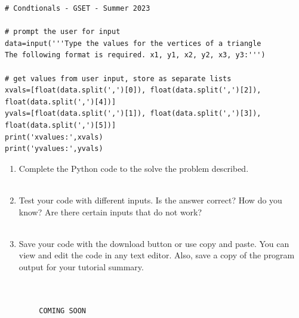 \documentclass[12pt]{article}
\begin{document}
\begin{description}[labelindent=1cm]
        \begin{lstlisting}
# Condtionals - GSET - Summer 2023 

# prompt the user for input
data=input('''Type the values for the vertices of a triangle
The following format is required. x1, y1, x2, y2, x3, y3:''')

# get values from user input, store as separate lists 
xvals=[float(data.split(',')[0]), float(data.split(',')[2]), float(data.split(',')[4])]
yvals=[float(data.split(',')[1]), float(data.split(',')[3]), float(data.split(',')[5])]
print('xvalues:',xvals)
print('yvalues:',yvals)

        \end{lstlisting}

\newpage
        \item[\textbf{\underline{Testing:}}] \hfill \vspace{0mm}
        \begin{enumerate}

        \item Complete the Python code to the solve the problem described. \\\\

        \item Test your code with different inputs. Is the answer correct? How do you know? Are there certain inputs that do not work? \\\\

        \item Save your code with the download button or use copy and paste. You can view and edit the code in any text editor. Also, save a copy of the program output for your tutorial summary. \\\\

        \end{enumerate}

        \item[\textbf{\underline{Solution Code:}}] \hfill \vspace{0mm}

        \begin{lstlisting}

        COMING SOON

        \end{lstlisting}


\end{description}
\end{document}
